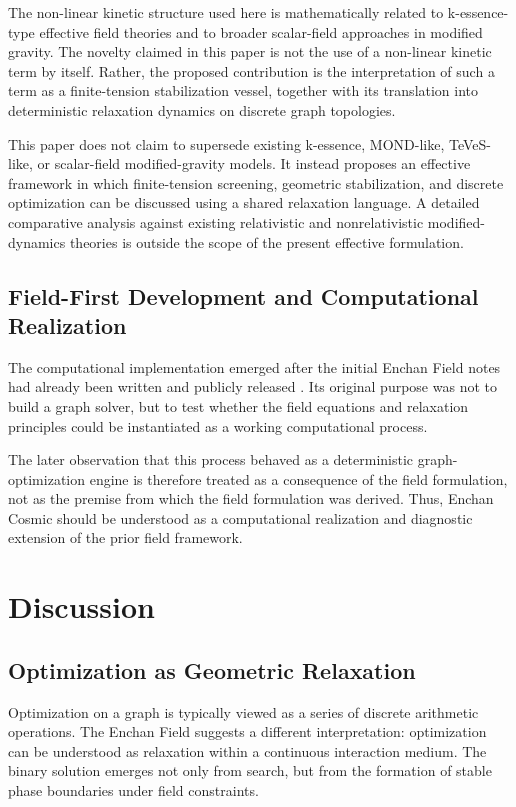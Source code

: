 \documentclass[11pt,a4paper]{article}
\begin{document}
The non-linear kinetic structure used here is mathematically related to k-essence-type effective field theories and to broader scalar-field approaches in modified gravity. The novelty claimed in this paper is not the use of a non-linear kinetic term by itself. Rather, the proposed contribution is the interpretation of such a term as a finite-tension stabilization vessel, together with its translation into deterministic relaxation dynamics on discrete graph topologies.

This paper does not claim to supersede existing k-essence, MOND-like, TeVeS-like, or scalar-field modified-gravity models. It instead proposes an effective framework in which finite-tension screening, geometric stabilization, and discrete optimization can be discussed using a shared relaxation language. A detailed comparative analysis against existing relativistic and nonrelativistic modified-dynamics theories is outside the scope of the present effective formulation.

\subsection{Field-First Development and Computational Realization}

The computational implementation emerged after the initial Enchan Field notes had already been written and publicly released \cite{KobayashiFieldNotes}. Its original purpose was not to build a graph solver, but to test whether the field equations and relaxation principles could be instantiated as a working computational process.

The later observation that this process behaved as a deterministic graph-optimization engine is therefore treated as a consequence of the field formulation, not as the premise from which the field formulation was derived. Thus, Enchan Cosmic should be understood as a computational realization and diagnostic extension of the prior field framework.

\clearpage

\section{Discussion}

\subsection{Optimization as Geometric Relaxation}

Optimization on a graph is typically viewed as a series of discrete arithmetic operations. The Enchan Field suggests a different interpretation: optimization can be understood as relaxation within a continuous interaction medium. The binary solution emerges not only from search, but from the formation of stable phase boundaries under field constraints.
\end{document}
